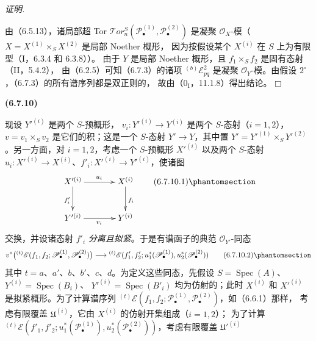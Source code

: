 \documentclass[UTF8,fontset=none,11pt,oneside,openany]{ctexbook}
\providecommand{\square}{\mdlgwhtsquare}
\newenvironment{env}[1][]{%
  \par\medskip\noindent\textbf{(#1)}\ %
}{\par}
\newenvironment{proof}{%
  \par\smallskip\noindent\textit{证明.}\ %
}{\hfill$\square$\par}
\newcommand{\oldpage}[2][]{%
  \hypertarget{ega-source-page-#1-#2}{}%
  \marginnote{\scriptsize\textbf{#1}~|~#2}\ignorespaces}
\let\EGAOriginalLabel\label
\renewcommand{\label}[1]{\phantomsection\EGAOriginalLabel{#1}}
\begin{document}
\begin{proof}
由（6.5.13），诸局部超 Tor
$\mathscr{T}\!or_n^S(\mathscr P_\bullet^{(1)},\mathscr P_\bullet^{(2)})$
是凝聚 $\mathscr O_X$-模（$X=X^{(1)}\times_S X^{(2)}$ 是局部 Noether 概形，
因为按假设某个 $X^{(i)}$ 在 $S$ 上为有限型（I，6.3.4 和 6.3.8））。
由于 $Y$ 是局部 Noether 概形，且 $f_1\times_S f_2$ 是固有态射（II，5.4.2），
由（6.2.5）可知（6.7.3）的诸项 ${}^{(b)}\mathscr E_{pq}^2$ 是凝聚
$\mathscr O_Y$-模。由假设 $2^\circ$，（6.7.3）的所有谱序列都是双正则的，
故由（$0_{\mathrm I}$，11.1.8）得出结论。
\end{proof}

\begin{env}[6.7.10]
现设 $Y'^{(i)}$ 是两个 $S$-预概形，
$v_i:Y'^{(i)}\to Y^{(i)}$ 是两个 $S$-态射（$i=1,2$），
$v=v_1\times_S v_2$ 是它们的积；这是一个 $S$-态射 $Y'\to Y$，其中置
$Y'=Y'^{(1)}\times_S Y'^{(2)}$。另一方面，对 $i=1,2$，考虑一个
$S$-预概形 $X'^{(i)}$ 以及两个 $S$-态射
$u_i:X'^{(i)}\to X^{(i)}$、$f'_i:X'^{(i)}\to Y'^{(i)}$，使诸图
\[
\xymatrix@C=36pt@R=28pt{
  X'^{(i)}\ar[r]^{u_i}\ar[d]_{f'_i}
  & X^{(i)}\ar[d]^{f_i}
  \\
  Y'^{(i)}\ar[r]_{v_i}
  & Y^{(i)}
}
\tag{6.7.10.1}\label{III.6.7.10.1.fr}
\]
交换，并设诸态射 $f'_i$ \emph{分离且拟紧}。于是有谱函子的典范
$\mathscr O_{Y'}$-同态
\[
  v^*\bigl({}^{(t)}\mathscr E
  (f_1,f_2;\mathscr P_\bullet^{(1)},\mathscr P_\bullet^{(2)})\bigr)
  \longrightarrow
  {}^{(t)}\mathscr E
  (f'_1,f'_2;u_1^*(\mathscr P_\bullet^{(1)}),
                 u_2^*(\mathscr P_\bullet^{(2)}))
  \tag{6.7.10.2}\label{III.6.7.10.2.fr}
\]
其中 $t=a$、$a'$、$b$、$b'$、$c$、$d$。为定义这些同态，先假设
$S=\operatorname{Spec}(A)$、
$Y^{(i)}=\operatorname{Spec}(B_i)$、
$Y'^{(i)}=\operatorname{Spec}(B'_i)$ 均为仿射的；此时 $X^{(i)}$ 和 $X'^{(i)}$
是拟紧概形。为了计算谱序列
${}^{(t)}\mathscr E
(f_1,f_2;\mathscr P_\bullet^{(1)},\mathscr P_\bullet^{(2)})$，如（6.6.1）那样，
考虑有限覆盖 $\mathfrak U^{(i)}$，它由 $X^{(i)}$ 的仿射开集组成（$i=1,2$）；
为了计算
${}^{(t)}\mathscr E
(f'_1,f'_2;u_1^*(\mathscr P_\bullet^{(1)}),
u_2^*(\mathscr P_\bullet^{(2)}))$，考虑有限覆盖 $\mathfrak U'^{(i)}$

\oldpage[III]{163}


\end{env}
\end{document}
